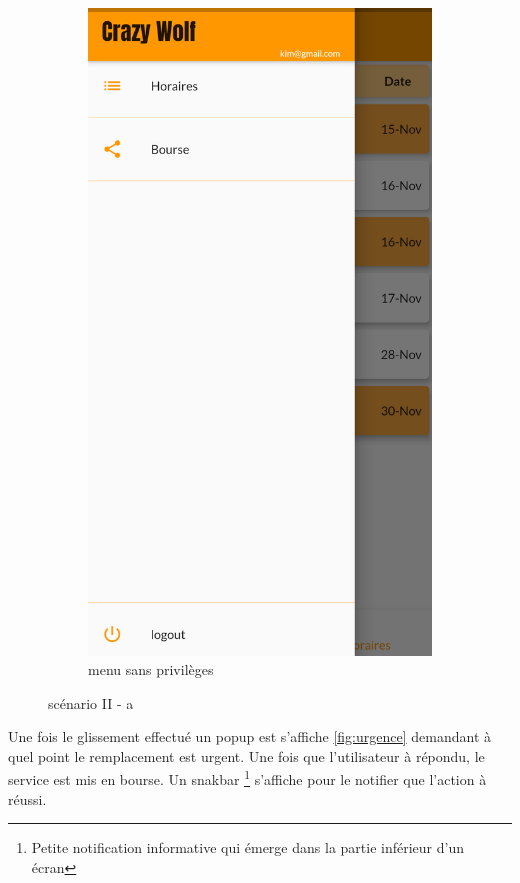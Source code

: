 \begin{figure}[!h]
\begin{subfigure}{.3\textwidth}
            \includegraphics[width=0.9\linewidth]{screenshots/scenario_02/menu_serveur_normal.png}
            \caption{menu sans privilèges}
            \label{fig:menu_sans_droits}
        \end{subfigure}
        \caption{scénario II - a}
        \label{fig:scen02a}
    \end{figure}

Une fois le glissement effectué un popup est s'affiche \ref{fig:urgence} demandant
à quel point le remplacement est urgent. Une fois que l'utilisateur à répondu, le service est mis
en bourse. Un snakbar \footnote{Petite notification informative qui émerge dans la partie inférieur d'un écran} s'affiche pour le notifier que l'action à réussi.

